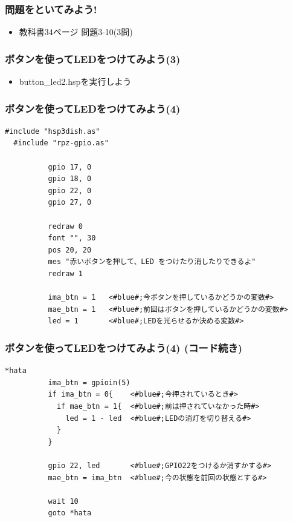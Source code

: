 \begin{frame}
  \frametitle{問題をといてみよう!}
  \begin{itemize}
    \item 教科書34ページ 問題3-10(3問)
  \end{itemize}
\end{frame}

\begin{frame}
  \frametitle{ボタンを使ってLEDをつけてみよう(3)}
  \begin{itemize}
    \item button\_led2.hspを実行しよう
  \end{itemize}
\end{frame}

\begin{frame}[fragile]
  \frametitle{ボタンを使ってLEDをつけてみよう(4)}
  \begin{lstlisting}[title=button\_led2.hsp, label=button_led2.hsp]
  #include "hsp3dish.as"
  #include "rpz-gpio.as"
  
          gpio 17, 0
          gpio 18, 0
          gpio 22, 0
          gpio 27, 0
        
          redraw 0
          font "", 30
          pos 20, 20
          mes "赤いボタンを押して、LED をつけたり消したりできるよ"
          redraw 1

          ima_btn = 1   <#blue#;今ボタンを押しているかどうかの変数#>
          mae_btn = 1   <#blue#;前回はボタンを押しているかどうかの変数#>
          led = 1       <#blue#;LEDを光らせるか決める変数#>
  \end{lstlisting}
\end{frame}

\begin{frame}[fragile]
  \frametitle{ボタンを使ってLEDをつけてみよう(4) (コード続き)}
  \begin{lstlisting}[title=button\_led2.hsp, label=button_led2.hsp]
  *hata
          ima_btn = gpioin(5)
          if ima_btn = 0{    <#blue#;今押されているとき#>
            if mae_btn = 1{  <#blue#;前は押されていなかった時#>
              led = 1 - led  <#blue#;LEDの消灯を切り替える#>
            }
          }

          gpio 22, led       <#blue#;GPIO22をつけるか消すかする#>
          mae_btn = ima_btn  <#blue#;今の状態を前回の状態とする#>

          wait 10
          goto *hata
  \end{lstlisting}
\end{frame}


